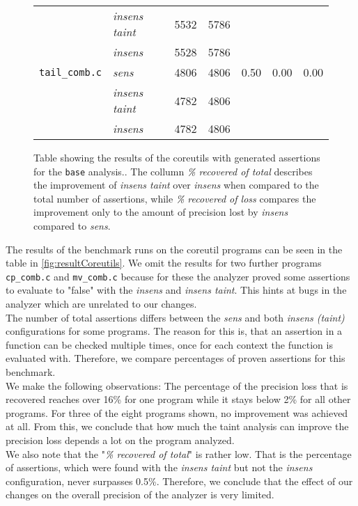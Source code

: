 \begin{figure}[!ht]
\begin{tabular}{l|l||r|r||r|r|r}
          & \textit{insens taint} & 5532 & 5786 & & & \\
          & \textit{insens} & 5528 & 5786 & & & \\
          \hline         
          \texttt{tail\_comb.c} & \textit{sens} & 4806 & 4806 & 0.50 & 0.00 & 0.00\\
          & \textit{insens taint} & 4782 & 4806 & & & \\
          & \textit{insens} & 4782 & 4806 & & & \\
          \hline
        \end{tabular}
        \caption[Table showing the results of the coreutils with generated assertions for the \texttt{base} analysis.]{Table showing the results of the coreutils with generated assertions for the \texttt{base} analysis.. The collumn \textit{\% recovered of total} describes the improvement of \textit{insens taint} over \textit{insens} when compared to the total number of assertions, while \textit{\% recovered of loss} compares the improvement only to the amount of precision lost by \textit{insens} compared to \textit{sens}.}
        \label{fig:resultCoreutils}
      \end{figure}

      \noindent The results of the benchmark runs on the coreutil programs can be seen in the table in \autoref{fig:resultCoreutils}. We omit the results for two further programs \texttt{cp\_comb.c} and \texttt{mv\_comb.c} because for these the analyzer proved some assertions to evaluate to "false" with the \textit{insens} and \textit{insens taint}. This hints at bugs in the analyzer which are unrelated to our changes.\\
      The number of total assertions differs between the \textit{sens} and both \textit{insens (taint)} configurations for some programs. The reason for this is, that an assertion in a function can be checked multiple times, once for each context the function is evaluated with. Therefore, we compare percentages of proven assertions for this benchmark.\\
      We make the following observations: The percentage of the precision loss that is recovered reaches over 16\% for one program while it stays below 2\% for all other programs. For three of the eight programs shown, no improvement was achieved at all. From this, we conclude that how much the taint analysis can improve the precision loss depends a lot on the program analyzed.\\
      We also note that the "\textit{\% recovered of total}" is rather low. That is the percentage of assertions, which were found with the \textit{insens taint} but not the \textit{insens} configuration, never surpasses 0.5\%. Therefore, we conclude that the effect of our changes on the overall precision of the analyzer is very limited.      
    
